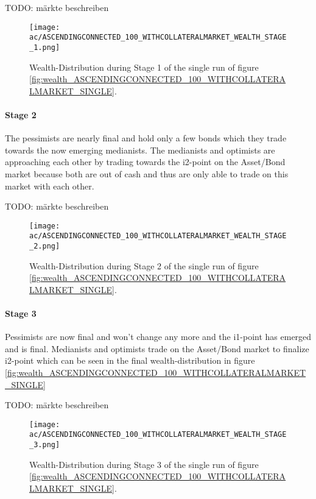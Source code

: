 \documentclass[Bachelorarbeit.tex]{subfiles}
\begin{document}
\medskip
TODO: märkte beschreiben
	
\begin{figure}[H]
	\centering
  \texttt{[image: ac/ASCENDINGCONNECTED\_100\_WITHCOLLATERALMARKET\_WEALTH\_STAGE\_1.png]}
  	\caption{Wealth-Distribution during Stage 1 of the single run of figure \ref{fig:wealth_ASCENDINGCONNECTED_100_WITHCOLLATERALMARKET_SINGLE}.}
	\label{fig:wealth_ASCENDINGCONNECTED_100_WITHCOLLATERALMARKET_WEALTH_STAGE_1}
\end{figure}

\paragraph{Stage 2}
The pessimists are nearly final and hold only a few bonds which they trade towards the now emerging medianists. The medianists and optimists are approaching each other by trading towards the i2-point on the Asset/Bond market because both are out of cash and thus are only able to trade on this market with each other.

\medskip
TODO: märkte beschreiben

\begin{figure}[H]
	\centering
  \texttt{[image: ac/ASCENDINGCONNECTED\_100\_WITHCOLLATERALMARKET\_WEALTH\_STAGE\_2.png]}
  	\caption{Wealth-Distribution during Stage 2 of the single run of figure \ref{fig:wealth_ASCENDINGCONNECTED_100_WITHCOLLATERALMARKET_SINGLE}.}
	\label{fig:wealth_ASCENDINGCONNECTED_100_WITHCOLLATERALMARKET_WEALTH_STAGE_2}
\end{figure}

\paragraph{Stage 3}
Pessimists are now final and won't change any more and the i1-point has emerged and is final. Medianists and optimists trade on the Asset/Bond market to finalize i2-point which can be seen in the final wealth-distribution in figure \ref{fig:wealth_ASCENDINGCONNECTED_100_WITHCOLLATERALMARKET_SINGLE}

\medskip
TODO: märkte beschreiben

\begin{figure}[H]
	\centering
  \texttt{[image: ac/ASCENDINGCONNECTED\_100\_WITHCOLLATERALMARKET\_WEALTH\_STAGE\_3.png]}
  	\caption{Wealth-Distribution during Stage 3 of the single run of figure \ref{fig:wealth_ASCENDINGCONNECTED_100_WITHCOLLATERALMARKET_SINGLE}.}
	\label{fig:wealth_ASCENDINGCONNECTED_100_WITHCOLLATERALMARKET_WEALTH_STAGE_3}
\end{figure}
\end{document}
